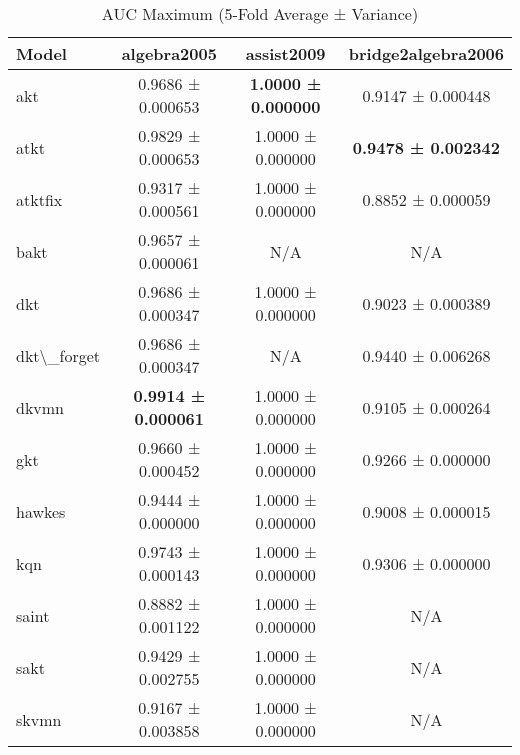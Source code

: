 \begin{table}[H]
\centering
\caption{AUC Maximum (5-Fold Average ± Variance)}
\label{tab:auc_max}
\begin{tabular}{lccc}
\toprule
Model & algebra2005 & assist2009 & bridge2algebra2006 \\
\midrule
akt & 0.9686 ± 0.000653 & \textbf{1.0000 ± 0.000000} & 0.9147 ± 0.000448 \\
atkt & 0.9829 ± 0.000653 & 1.0000 ± 0.000000 & \textbf{0.9478 ± 0.002342} \\
atktfix & 0.9317 ± 0.000561 & 1.0000 ± 0.000000 & 0.8852 ± 0.000059 \\
bakt & 0.9657 ± 0.000061 & N/A & N/A \\
dkt & 0.9686 ± 0.000347 & 1.0000 ± 0.000000 & 0.9023 ± 0.000389 \\
dkt\textbackslash{}_forget & 0.9686 ± 0.000347 & N/A & 0.9440 ± 0.006268 \\
dkvmn & \textbf{0.9914 ± 0.000061} & 1.0000 ± 0.000000 & 0.9105 ± 0.000264 \\
gkt & 0.9660 ± 0.000452 & 1.0000 ± 0.000000 & 0.9266 ± 0.000000 \\
hawkes & 0.9444 ± 0.000000 & 1.0000 ± 0.000000 & 0.9008 ± 0.000015 \\
kqn & 0.9743 ± 0.000143 & 1.0000 ± 0.000000 & 0.9306 ± 0.000000 \\
saint & 0.8882 ± 0.001122 & 1.0000 ± 0.000000 & N/A \\
sakt & 0.9429 ± 0.002755 & 1.0000 ± 0.000000 & N/A \\
skvmn & 0.9167 ± 0.003858 & 1.0000 ± 0.000000 & N/A \\
\bottomrule
\end{tabular}
\end{table}
